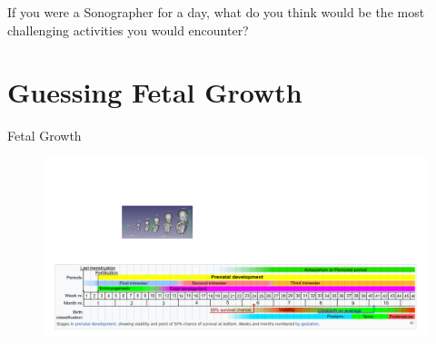

{
\begin{frame}{}

\BigSizeFont
If you were a Sonographer for a day,
what do you think would be the most challenging activities you would encounter?

\end{frame}
}




\section{Guessing Fetal Growth}



{
\begin{frame}{Fetal Growth}
      \begin{figure}
        \centering
        \includegraphics[width=1.0\textwidth]{./figures/fetal-growth/versions/drawing-v01.png}
      \end{figure}
\end{frame}
}


